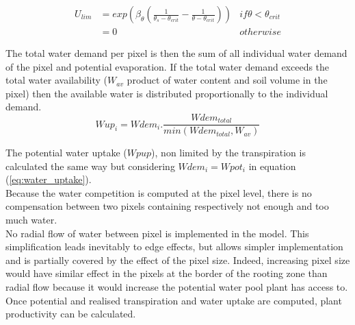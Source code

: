 \begin{align}
U_{lim} &= exp\left(\beta_{\theta} \left( \frac{1}{\theta_{s} - \theta_{crit}} - \frac{1}{\theta - \theta_{crit}}\right)\right) & if \theta < \theta_{crit}\\
 &= 0 & otherwise
\end{align}

The total water demand per pixel is then the sum of all individual water demand of the pixel and potential evaporation. If the total water demand exceeds the total water availability ($W_{av}$ product of water content and soil volume in the pixel) then the available water is distributed proportionally to the individual demand.\\
\begin{equation}\label{eq:water_uptake}
Wup_{i} = Wdem_{i} . \frac{Wdem_{total}}{min(Wdem_{total}, W_{av})}
\end{equation}


\indent The potential water uptake ($Wpup$), non limited by the transpiration is calculated the same way but considering $Wdem_{i} = Wpot_{i}$ in equation (\ref{eq:water_uptake}).\\
\indent Because the water competition is computed at the pixel level, there is no compensation between two pixels containing respectively not enough and too much water.\\
\indent No radial flow of water between pixel is implemented in the model. This simplification leads inevitably to edge effects, but allows simpler implementation and is partially covered by the effect of the pixel size. Indeed, increasing pixel size would have similar effect in the pixels at the border of the rooting zone than radial flow because it would increase the potential water pool plant has access to.\\

\indent Once potential and realised transpiration and water uptake are computed, 
plant productivity can be calculated.


